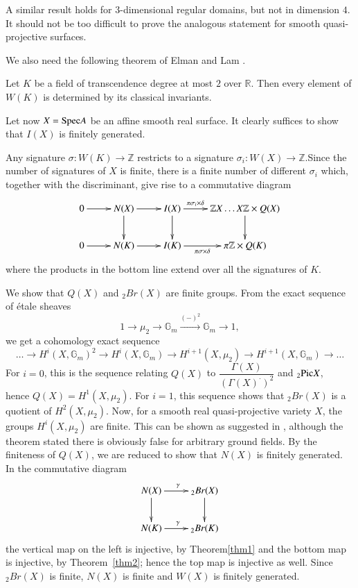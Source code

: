 A similar result holds for $3$-dimensional regular domains, but not in dimension $4$. It should not be too difficult to prove the analogous statement for smooth quasi-projective surfaces. 

We also need the following theorem of Elman and Lam \cite{key6}. 

\begin{thm}\label{thm2}
Let $K$ be a field of transcendence degree at most $2$ over $\mathbb{R}$. Then every element of $W(K)$ is determined by its classical invariants.
\end{thm}

Let now $X=\mathrm{Spec} A$ be an affine smooth real surface. It clearly suffices to show that $I(X)$ is finitely generated. 

Any signature $\sigma:W(K)\to \mathbb{Z}$ restricts to a signature $\sigma_i:W(X)\to \mathbb{Z}$.\pageoriginale Since the number of signatures of $X$ is finite, there is a finite number of different $\sigma_i$ which, together with the discriminant, give rise to a commutative diagram 
$$
\xymatrix{0\ar[r]&N(X)\ar[r]\ar[d]&I(X)\ar[d]\ar[r]^-{\pi\sigma_i\times \delta}&\mathbb{Z}X\ldots X\mathbb{Z}\ar[d]\times Q(X)\\
0\ar[r]&N(K)\ar[r]&I(K)\ar[r]_-{\pi \sigma \times \delta}& \pi\mathbb{Z}\times Q(K)}
$$
where the products in the bottom line extend over all the signatures of $K$. 

We show that $Q(X)$ and $_2Br(X)$ are finite groups. From the exact sequence of \'{e}tale sheaves 
$$
1\to \mu_2\to \mathbb{G}_m\xrightarrow{(-)^{2}}\mathbb{G}_m\to 1, 
$$
we get a cohomology exact sequence 
$$
\ldots\to H^{i}(X,\mathbb{G}_m)^{2}\to H^{i}(X,\mathbb{G}_m)\to H^{i+1}(X,\mu_2)\to H^{i+1}(X,\mathbb{G}_m)\to\ldots
$$
For $i=0$, this is the sequence relating $Q(X)$ to $\dfrac{\Gamma(X)}{(\Gamma(X)^{\cdot})^{2}}$ and $_2\mathrm{Pic} X$,\\hence $Q(X)=H^{1}(X,\mu_2)$. For $i=1$, this sequence shows that $_2Br(X)$ is a quotient of $H^{2}(X,\mu_2)$. Now, for a smooth real quasi-projective variety $X$, the groups $H^{i}(X,\mu_2)$ are finite. This can be shown as suggested in \cite[p. 244]{key12}, although the theorem stated there is obviously false for arbitrary ground fields. By the finiteness of $Q(X)$, we are reduced to show that $N(X)$ is finitely generated. In the commutative diagram 
$$
\xymatrix{N(X)\ar[d]\ar[r]^{\gamma}&_2Br(X)\ar[d]\\
N(K)\ar[r]^{\gamma}&_2Br(K)}
$$\pageoriginale
the vertical map on the left is injective, by Theorem\ref{thm1} and the bottom map is injective, by Theorem~\ref{thm2}; hence the top map is injective as well. Since $_2Br(X)$ is finite, $N(X)$ is finite and $W(X)$ is finitely generated. 

